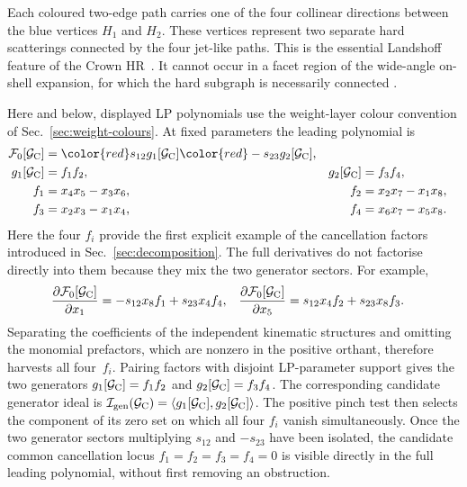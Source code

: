 \documentclass[a4paper,11pt]{article}
\newcommand{\SLcolour}[1]{{\color{red}#1}}
\begin{document}
Each coloured two-edge path carries one of the four collinear directions
between the blue vertices \(H_1\) and \(H_2\).  These vertices represent two
separate hard scatterings connected by the four jet-like paths.  This is the
essential Landshoff feature of the Crown HR~\cite{Gardi:2024axt}.  It cannot
occur in a facet region of the wide-angle on-shell expansion, for which the
hard subgraph is necessarily connected \cite{Gardi:2022khw,Ma:2023hrt}.

Here and below, displayed LP polynomials use the weight-layer colour convention
of Sec.~\ref{sec:weight-colours}.  At fixed parameters the leading polynomial is
\begin{equation}
\begin{aligned}
 \mathcal F_0[\mathcal G_{\rm C}]
   &={\SLcolour{s_{12}g_1[\mathcal G_{\rm C}]}}
     {\SLcolour{-s_{23}g_2[\mathcal G_{\rm C}]}},\\
 g_1[\mathcal G_{\rm C}]&=f_1f_2,
 &g_2[\mathcal G_{\rm C}]&=f_3f_4,\\
 f_1&=x_4x_5-x_3x_6,
 &f_2&=x_2x_7-x_1x_8,\\
 f_3&=x_2x_3-x_1x_4,
 &f_4&=x_6x_7-x_5x_8.
\end{aligned}
 \label{eq:crown-F0}
\end{equation}
Here the four \(f_i\) provide the first explicit example of the cancellation
factors introduced in Sec.~\ref{sec:decomposition}.  The full derivatives do
not factorise directly into them because they mix the two generator sectors.
For example,
\begin{align*}
 \frac{\partial\mathcal F_0[\mathcal G_{\rm C}]}{\partial x_1}
   &=-s_{12}x_8f_1+s_{23}x_4f_4,
 &
 \frac{\partial\mathcal F_0[\mathcal G_{\rm C}]}{\partial x_5}
   &= s_{12}x_4f_2+s_{23}x_8f_3.
\end{align*}
Separating the coefficients of the independent kinematic structures and
omitting the monomial prefactors, which are nonzero in the positive orthant,
therefore harvests all four~\(f_i\).  Pairing factors with disjoint
LP-parameter support gives the two generators
\(g_1[\mathcal G_{\rm C}]=f_1f_2\) and
\(g_2[\mathcal G_{\rm C}]=f_3f_4\).
The corresponding candidate generator ideal is
\(\mathcal I_{\rm gen}(\mathcal G_{\rm C})
=\langle g_1[\mathcal G_{\rm C}],g_2[\mathcal G_{\rm C}]\rangle\).  The
positive pinch test then selects the component of its zero set on which all
four \(f_i\) vanish simultaneously.
Once the two generator sectors multiplying \(s_{12}\) and \(-s_{23}\) have
been isolated, the candidate common cancellation locus
\(f_1=f_2=f_3=f_4=0\) is visible directly in the full leading polynomial,
without first removing an obstruction.
\end{document}
